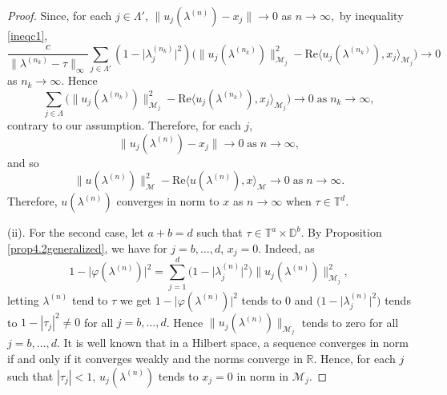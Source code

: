 \documentclass[11pt, reqno]{amsart}
\newcommand\1{\boldsymbol {1}}
\numberwithin{equation}{section}
\begin{document}
\begin{proof}
Since, for each $j \in \Lambda'$, $\|u_{j}(\lambda^{(n)}) - x_j\| \rightarrow 0 $ as $n \rightarrow \infty,$
by inequality \eqref{ineqc1},
$$\dfrac{c}{\|\lambda^{(n_k)}-\tau\|_{\infty}}\sum_{j \in \Lambda'}(1-\lvert \lambda^{(n_k)}_{j} \rvert^{2})\Big(\|u_{j}(\lambda^{(n_k)})\|_{\mathcal{M}_{j}}^{2}-\mathrm{Re} \langle u_{j}(\lambda^{(n_k)}),x_{j}\rangle_{\mathcal{M}_{j}} \Big)
\rightarrow 0$$
 as  $n_k\rightarrow \infty$. Hence
$$ \sum_{j \in \Lambda}\Big(\|u_{j}(\lambda^{(n_k)})\|_{\mathcal{M}_{j}}^{2}-\mathrm{Re} \langle u_{j}(\lambda^{(n_k)}),x_{j}\rangle_{\mathcal{M}_{j}} \Big)\rightarrow 0 \; \text {as} \; n_k \rightarrow \infty,$$
contrary to our assumption. Therefore, for each $j$, 
$$\|u_{j}(\lambda^{(n)}) - x_j\| \rightarrow 0 \; \text{as} \; n \rightarrow \infty,$$
and so
 $$\|u(\lambda^{(n)})\|_{\mathcal{M}}^{2}-\mathrm{Re} \langle u(\lambda^{(n)}),x\rangle_{\mathcal{M}} \rightarrow 0 \; \text {as} \; n \rightarrow \infty.$$  
Therefore,  $u(\lambda^{(n)})$ converges in norm to $x$ as $n \rightarrow \infty$ when $\tau\in\mathbb{T}^{d}$.
 

 {\rm (ii)}. For the second case, let $a+b=d$ such that $\tau\in\mathbb{T}^{a}\times \mathbb{D}^{b}$. By Proposition \ref{prop4.2generalized}, we have for $j=b,\hdots, d$, $x_{j}=0$. Indeed, as 
$$1-\lvert \varphi(\lambda^{(n)})\rvert^{2}=\sum_{j=1}^{d}\big(1-\lvert \lambda_{j}^{(n)}\rvert^{2}\big)\|u_{j}(\lambda^{(n)})\|_{\mathcal{M}_{j}}^{2},$$
letting $\lambda^{(n)}$ tend to $\tau$ we get $1-\lvert \varphi(\lambda^{(n)})\rvert^{2}$ tends to $0$ and 
$\big(1-\lvert \lambda_{j}^{(n)}\rvert^{2}\big)$ tends to $1 -|\tau_j|^2 \neq 0$ for  all $j=b,\hdots, d$. Hence
 $\|u_{j}(\lambda^{(n)})\|_{\mathcal{M}_{j}}$ tends to zero for all $j=b,\hdots, d$. 
It is well known that in a Hilbert space, a sequence converges in norm if and only if it converges weakly and the norms converge in $\mathbb{R}$. Hence, for each $j$ such that $ |\tau_j| < 1$, $u_{j}(\lambda^{(n)})$ tends to  $x_{j}=0$ in norm in ${\mathcal{M}_{j}}$.


\end{proof}
\end{document}
